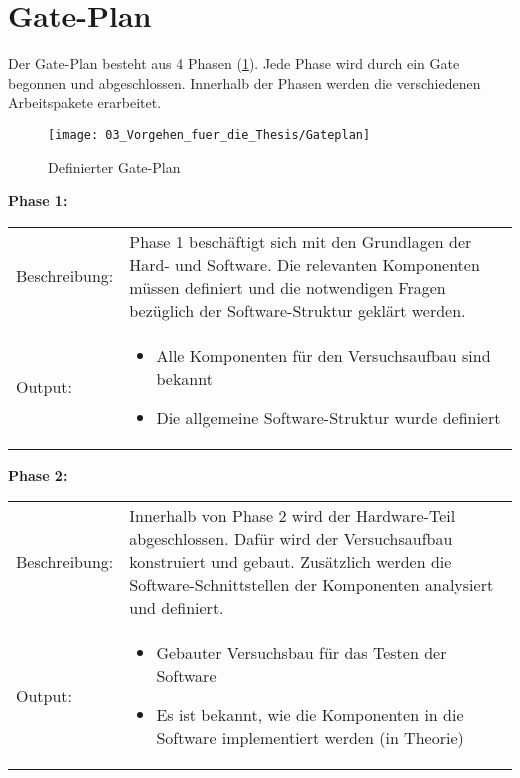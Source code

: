 \section{Gate-Plan} \label{Gate-Plan}

	Der Gate-Plan besteht aus 4 Phasen (\ref{fig:Gateplan}). Jede Phase wird durch ein Gate begonnen und abgeschlossen. Innerhalb der Phasen werden die verschiedenen Arbeitspakete erarbeitet. 

	\begin{figure}[h!]
		\centering
		\texttt{[image: 03\_Vorgehen\_fuer\_die\_Thesis/Gateplan]}
		\captionsetup{justification=centering}
		\caption{Definierter Gate-Plan}
		\label{fig:Gateplan}
	\end{figure}
	
	\textbf{Phase 1:} \vspace{2mm} 
	\\
		\begin{tabularx}{\textwidth}{@{}>{}p{7em} X@{}}
			Beschreibung: & 
			Phase 1 beschäftigt sich mit den Grundlagen der Hard- und Software. Die relevanten Komponenten müssen definiert und die notwendigen Fragen bezüglich der Software-Struktur geklärt werden.
			\\
			
			Output: & 
			\begin{itemize}
				\item Alle Komponenten für den Versuchsaufbau sind bekannt
				\item Die allgemeine Software-Struktur wurde definiert
			\end{itemize}
		\end{tabularx}
	
	\textbf{Phase 2:} \vspace{2mm} 
	\\
		\begin{tabularx}{\textwidth}{@{}>{}p{7em} X@{}}
			Beschreibung: & 
			Innerhalb von Phase 2 wird der Hardware-Teil abgeschlossen. Dafür wird der Versuchsaufbau konstruiert und gebaut. Zusätzlich werden die Software-Schnittstellen der Komponenten analysiert und definiert. 
			\\
			
			Output: & 
			\begin{itemize}
				\item Gebauter Versuchsbau für das Testen der Software
				\item Es ist bekannt, wie die Komponenten in die Software implementiert werden (in Theorie)
			\end{itemize}
		\end{tabularx}
	
